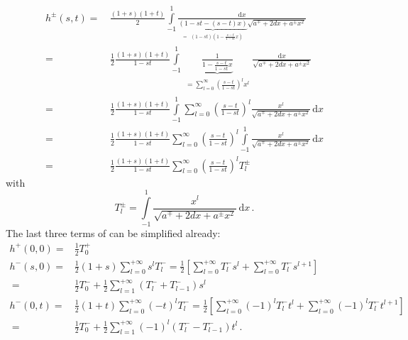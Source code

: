 \begin{align}
 h^{\pm}(s,t)
 =&\, \frac{(1+s)(1+t)}{2}
    \int\limits_{-1}^{1}
     \frac{\mathrm{d}x}{\underbrace{\left( 1-st-(s-t)x \right)}_{\begin{aligned}
            =& (1-st)\left(1- \frac{s-t}{1-st} x \right)
            \end{aligned}}\sqrt{ a^{\mp}  + 2 d x + a^{\pm} x^2 }} \nonumber \\
 =&\, \frac{1}{2}
    \frac{(1+s)(1+t)}{1-st}
    \int\limits_{-1}^{1}
    \underbrace{\frac{1}{1- \frac{s-t}{1-st} x}}_{\begin{aligned}
                      = \sum\limits_{l=0}^{\infty} \left( \frac{s-t}{1-st} \right)^l x^l
                                                          \end{aligned}}
     \frac{\mathrm{d}x}{\sqrt{ a^{\mp}  + 2 d x + a^{\pm} x^2 }} \nonumber \\
 =&\, \frac{1}{2}
    \frac{(1+s)(1+t)}{1-st}
    \int\limits_{-1}^{1}
      \sum\limits_{l=0}^{\infty} \left( \frac{s-t}{1-st} \right)^l
      \frac{x^l}{\sqrt{ a^{\mp}  + 2 d x + a^{\pm} x^2 }}
      \,\mathrm{d}x \nonumber \\
 =&\, \frac{1}{2}
    \frac{(1+s)(1+t)}{1-st}
    \sum\limits_{l=0}^{\infty} \left( \frac{s-t}{1-st} \right)^l
    \int\limits_{-1}^{1}
      \frac{x^l}{\sqrt{ a^{\mp}  + 2 d x + a^{\pm} x^2 }}
      \,\mathrm{d}x \nonumber \\
 =&\, \frac{1}{2}
    \frac{(1+s)(1+t)}{1-st}
    \sum\limits_{l=0}^{\infty} \left( \frac{s-t}{1-st} \right)^l
    T^{\pm}_l \label{eqn:h_pm_st}
\end{align}
with
\begin{equation}
 T^{\pm}_l
 = \int\limits_{-1}^{1}
      \frac{x^l}{\sqrt{ a^{\mp}  + 2 d x + a^{\pm} x^2 }}
      \,\mathrm{d}x \, . \label{eqn:T_pm_l}
\end{equation}
The last three terms of  can be simplified already:
\begin{align}
  h^{+}(0,0) =& \frac{1}{2} T^{+}_0 \label{eqn:h_p_00} \\
  h^{-}(s,0) =& \frac{1}{2} (1+s) \sum\limits_{l=0}^{+\infty} s^l T^{-}_l
             =  \frac{1}{2} \left[ \sum\limits_{l=0}^{+\infty} T^{-}_l s^l + \sum\limits_{l=0}^{+\infty} T^{-}_l s^{l+1} \right] \nonumber \\
      ~      =& \frac{1}{2} T^{-}_0 + \frac{1}{2} \sum\limits_{l=1}^{+\infty} \left( T^{-}_l + T^{-}_{l-1} \right) s^l \label{eqn:h_m_s0} \\
  h^{-}(0,t) =& \frac{1}{2} (1+t) \sum\limits_{l=0}^{+\infty} (-t)^l T^{-}_l
             =  \frac{1}{2} \left[ \sum\limits_{l=0}^{+\infty} (-1)^l T^{-}_l t^l + \sum\limits_{l=0}^{+\infty} (-1)^l T^{-}_l t^{l+1} \right] \nonumber \\
      ~      =& \frac{1}{2} T^{-}_0 + \frac{1}{2} \sum\limits_{l=1}^{+\infty} (-1)^l \left( T^{-}_l - T^{-}_{l-1} \right) t^l \label{eqn:h_m_0t} \, .
\end{align}
